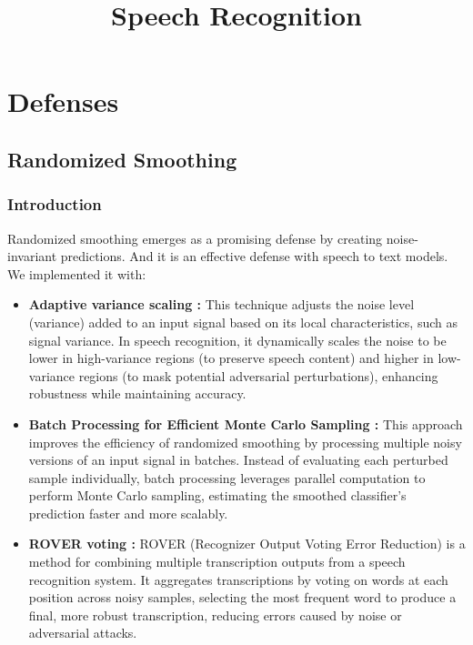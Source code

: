 \documentclass[a4paper,12pt]{article}
\title{Speech Recognition}
\begin{document}
\maketitle
\section{Defenses}
\subsection{Randomized Smoothing}
\subsubsection{Introduction}
Randomized smoothing \cite{cohen2019certified} emerges as a promising defense by creating noise-invariant predictions. And it is an effective defense with speech to text models\cite{zelasko2021adversarial}. We implemented it with:

\begin{itemize}
    \item \textbf{Adaptive variance scaling \cite{li2024adaptive}:} This technique adjusts the noise level (variance) added to an input signal based on its local characteristics, such as signal variance. In speech recognition, it dynamically scales the noise to be lower in high-variance regions (to preserve speech content) and higher in low-variance regions (to mask potential adversarial perturbations), enhancing robustness while maintaining accuracy.
    \item \textbf{Batch Processing for Efficient Monte Carlo Sampling \cite{cohen2019certified}:} This approach improves the efficiency of randomized smoothing by processing multiple noisy versions of an input signal in batches. Instead of evaluating each perturbed sample individually, batch processing leverages parallel computation to perform Monte Carlo sampling, estimating the smoothed classifier's prediction faster and more scalably. 
    \item \textbf{ROVER voting \cite{olivier2022sequential}:} ROVER (Recognizer Output Voting Error Reduction) is a method for combining multiple transcription outputs from a speech recognition system. It aggregates transcriptions by voting on words at each position across noisy samples, selecting the most frequent word to produce a final, more robust transcription, reducing errors caused by noise or adversarial attacks.
\end{itemize}
\end{document}
